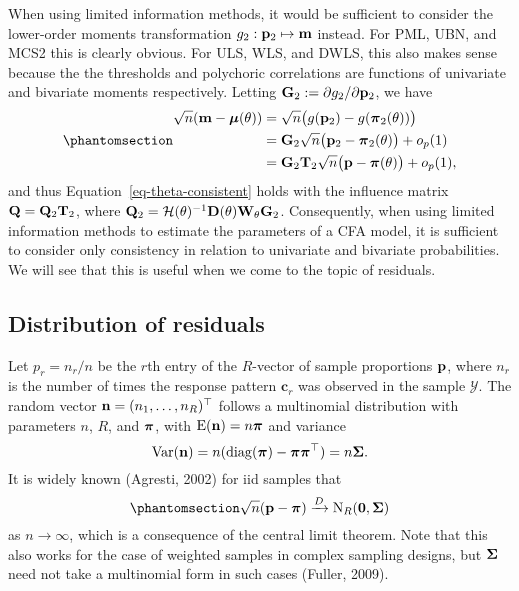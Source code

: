 \documentclass[
  letterpaper,
  DIV=11,
  numbers=noendperiod]{scrartcl}
\begin{document}
When using limited information methods, it would be sufficient to
consider the lower-order moments transformation
\(g_2: {\mathbf p}_2 \mapsto {\mathbf m}\) instead. For PML, UBN, and MCS2 this is
clearly obvious. For ULS, WLS, and DWLS, this also makes sense because
the the thresholds and polychoric correlations are functions of
univariate and bivariate moments respectively. Letting
\({\mathbf G}_2 := \partial g_2 / \partial {\mathbf p}_2\), we have
\begin{equation}\phantomsection\label{eq-moments-transform2}{
\begin{aligned}
\sqrt n (\bmm - \bmu(\theta)) 
&= \sqrt n \big(g(\bp_2) - g(\bpi_2(\theta))\big) \\
&= \bG_2 \sqrt n \big(\bp_2 - \bpi_2(\theta)\big) + o_p(1) \\
&= \bG_2\bT_2 \sqrt n \big(\bp - \bpi(\theta)\big) + o_p(1),
\end{aligned}
}\end{equation} and thus Equation~\ref{eq-theta-consistent} holds with
the influence matrix \({\mathbf Q} = {\mathbf Q}_2{\mathbf T}_2\), where
\({\mathbf Q}_2 = \mathcal H(\theta)^{-1} {\mathbf D}(\theta){\mathbf W}_\theta {\mathbf G}_2\).
Consequently, when using limited information methods to estimate the
parameters of a CFA model, it is sufficient to consider only consistency
in relation to univariate and bivariate probabilities. We will see that
this is useful when we come to the topic of residuals.

\subsection{Distribution of residuals}\label{distribution-of-residuals}

Let \(p_r = n_r / n\) be the \(r\)th entry of the \(R\)-vector of sample
proportions \({\mathbf p}\), where \(n_r\) is the number of times the response
pattern \(\mathbf c_r\) was observed in the sample \(\mathcal Y\). The
random vector \({\mathbf n} = (n_1,\dots,n_R)^\top\) follows a multinomial
distribution with parameters \(n\), \(R\), and \({\boldsymbol\pi}\), with
\(\operatorname{E}({\mathbf n})=n{\boldsymbol\pi}\) and variance \[
\operatorname{Var}({\mathbf n}) = n (\operatorname{diag}({\boldsymbol\pi}) - {\boldsymbol\pi} {\boldsymbol\pi}^\top) = n {\boldsymbol\Sigma}.
\] It is widely known (Agresti, 2002) for iid samples that
\begin{equation}\phantomsection\label{eq-clt-prop}{
\sqrt{n} (\bp - \bpi) \xrightarrow{D} {\N}_R(\bzero, \bSigma)
}\end{equation} as \(n\to\infty\), which is a consequence of the central
limit theorem. Note that this also works for the case of weighted
samples in complex sampling designs, but \({\boldsymbol\Sigma}\) need not take a
multinomial form in such cases (Fuller, 2009).
\end{document}
